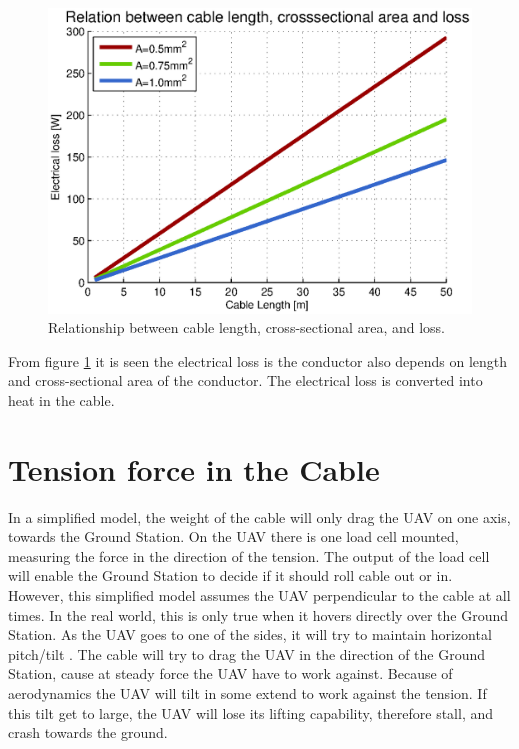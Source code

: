 \begin{figure}[hbtp]
\centering
\includegraphics[scale=1]{graphics/matlab/cable_relation_lenght_loss_crosssection.eps}
\caption[Relationship between cable length, cross-sectional area and cable loss.]{Relationship between cable length, cross-sectional area, and  loss.}
\label{fig:relationship_loss_length}
\end{figure}

\noindent
From figure \ref{fig:relationship_loss_length} it is seen the electrical loss is the conductor also depends on length and cross-sectional area of the conductor. The electrical loss is converted into heat in the cable.


\section{Tension force in the Cable}
In a simplified model, the weight of the cable will only drag the UAV on one axis, towards the Ground Station. On the UAV there is one load cell mounted, measuring the force in the direction of the tension. The output of the load cell will enable the Ground Station to decide if it should roll cable out or in. However, this simplified model assumes the UAV perpendicular to the cable at all times. 
In the real world, this is only true when it hovers directly over the Ground Station. As the UAV goes to one of the sides, it will try to maintain horizontal pitch/tilt . The cable will try to drag the UAV in the direction of the Ground Station, cause at steady force the UAV have to work against. Because of aerodynamics the UAV will tilt in some extend to work against the tension. If this tilt get to large, the UAV will lose its lifting capability, therefore stall, and crash towards the ground.

